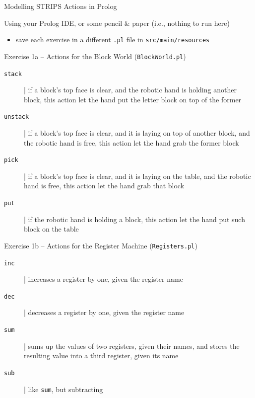 \documentclass[presentation]{beamer}\mode<presentation>{\usetheme{AMSBolognaFC}}
\begin{document}
\begin{frame}[allowframebreaks]{Modelling STRIPS Actions in Prolog}

Using your Prolog IDE, or some pencil \& paper (i.e., nothing to run here)
%
\begin{itemize}
    \item save each exercise in a different \texttt{.pl} file in \texttt{src/main/\alert{resources}}
\end{itemize}

\begin{block}{Exercise 1a -- Actions for the Block World (\texttt{BlockWorld.pl})}
   	\begin{description}
   	    \item[\texttt{stack}] | if a block's top face is clear, and the robotic hand is holding another block, this action let the hand put the letter block on top of the former

   	    \item[\texttt{unstack}] | if a block's top face is clear, and it is laying on top of another block, and the robotic hand is free, this action let the hand grab the former block

   	    \item[\texttt{pick}] | if a block's top face is clear, and it is laying on the table, and the robotic hand is free, this action let the hand grab that block

   	    \item[\texttt{put}] | if the robotic hand is holding a block, this action let the hand put such block on the table
   	\end{description}
\end{block}

\begin{block}{Exercise 1b -- Actions for the Register Machine (\texttt{Registers.pl})}
   	\begin{description}
   	    \item[\texttt{inc}] | increases a register by one, given the register name
   	    \item[\texttt{dec}] | decreases a register by one, given the register name
   	    \item[\texttt{sum}] | sums up the values of two registers, given their names, and stores the resulting value into a third register, given its name
   	    \item[\texttt{sub}] | like \texttt{sum}, but subtracting
   	\end{description}
\end{block}


\end{frame}
\end{document}
